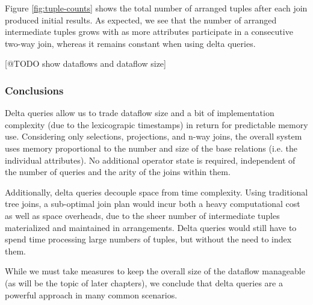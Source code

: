 \documentclass[../catalog.tex]{subfiles}
\begin{document}
Figure \ref{fig:tuple-counts} shows the total number of arranged
tuples after each join produced initial results. As expected, we see
that the number of arranged intermediate tuples grows with as more
attributes participate in a consecutive two-way join, whereas it
remains constant when using delta queries.

[@TODO show dataflows and dataflow size]

\subsubsection{Conclusions}

Delta queries allow us to trade dataflow size and a bit of
implementation complexity (due to the lexicograpic timestamps) in
return for predictable memory use. Considering only selections,
projections, and n-way joins, the overall system uses memory
proportional to the number and size of the base relations (i.e. the
individual attributes). No additional operator state is required,
independent of the number of queries and the arity of the joins within
them.

Additionally, delta queries decouple space from time complexity. Using
traditional tree joins, a sub-optimal join plan would incur both a
heavy computational cost as well as space overheads, due to the sheer
number of intermediate tuples materialized and maintained in
arrangements. Delta queries would still have to spend time processing
large numbers of tuples, but without the need to index them.

While we must take measures to keep the overall size of the dataflow
manageable (as will be the topic of later chapters), we conclude that
delta queries are a powerful approach in many common scenarios.
\end{document}
